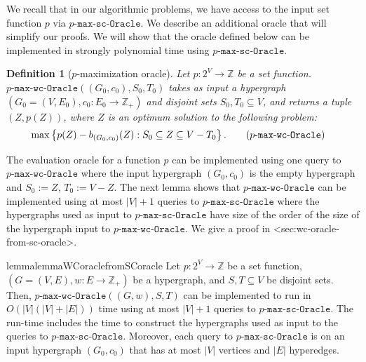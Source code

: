 \documentclass{article}
\def\Cref#1{<#1>}%
\newtheorem{definition}{Definition}[section]
\newcommand{\functionMaximizationOracle}[1]{\ensuremath{{#1}\text{-}\mathtt{max}\text{-}\mathtt{wc}\text{-}\mathtt{Oracle}}\xspace}
\newcommand{\functionMaximizationOracleStrongCover}[1]{\ensuremath{{#1}\text{-}\mathtt{max}\text{-}\mathtt{sc}\text{-}\mathtt{Oracle}}\xspace}
\newcommand{\functionMaximizationEmptyOracle}[1]
{\ensuremath{{#1}\text{-}\mathtt{max}\text{-}\mathtt{Oracle}}\xspace}
\newcommand{\knote}[1]{{\color{red}[{\tiny Karthik: \bf #1}]\marginpar{\color{red}*}}}
\providecommand{\Z}{\mathbb{Z}}
\begin{document}
We recall that in our algorithmic problems, we have access to the input set function $p$ via \functionMaximizationOracleStrongCover{p}. 
We describe an additional oracle that will simplify our proofs. We will show that the oracle defined below can be implemented in strongly polynomial time using \functionMaximizationOracleStrongCover{p}. 
\begin{definition}[$p$-maximization oracle]
    Let $p: 2^V\rightarrow \Z$ be a set function. 
    \functionMaximizationOracle{p}$((G_0, c_0), S_0, T_0)$ takes as input a hypergraph $(G_0=(V, E_0), c_0: E_0\rightarrow \mathbb{Z}_{+})$  
    and disjoint sets $S_0, T_0\subseteq V$, and returns a tuple $(Z, p(Z))$, where $Z$ is an optimum solution to the following problem:
    \begin{align*}
        \max & \left\{p(Z)-b_{(G_0, c_0)}(Z): S_0\subseteq Z\subseteq V-T_0\right\}. \tag{\functionMaximizationOracle{p}}\label{tag:oracle-main}
        \end{align*} 
\end{definition}
The evaluation oracle for a function $p$ can be implemented using one query to  
\functionMaximizationOracle{p} where the input hypergraph $(G_0, c_0)$ is the empty hypergraph and $S_0 := Z$, $T_0 := V - Z$. The next lemma shows that \functionMaximizationOracle{p} can be implemented using at most $|V|+1$ queries to \functionMaximizationOracleStrongCover{p} where the hypergraphs used as input to  \functionMaximizationOracleStrongCover{p} have size of the order of the size of the hypergraph input to \functionMaximizationOracle{p}. We give a proof in \Cref{sec:wc-oracle-from-sc-oracle}.  

\begin{restatable}{lemma}{lemmaWCoraclefromSCoracle}\label{lem:Preliminaries:wc-oracle-from-sc-oracle}
Let $p: 2^V\rightarrow \Z$ be a set function, $(G = (V, E), w:E\rightarrow\Z_+)$ be a hypergraph, and $S, T \subseteq V$ be disjoint sets. Then, $\functionMaximizationOracle{p}((G, w), S, T)$ can be implemented to run in $O(|V|(|V|+|E|))$ time using at most $|V|+1$ queries to $\functionMaximizationOracleStrongCover{p}$.
The run-time includes the time to construct the hypergraphs used as input to the queries to \functionMaximizationOracleStrongCover{p}. Moreover, each query to \functionMaximizationOracleStrongCover{p} is on an input hypergraph $(G_0, c_0)$ that has at most $|V|$ vertices and $|E|$ hyperedges.
\end{restatable}
\end{document}

